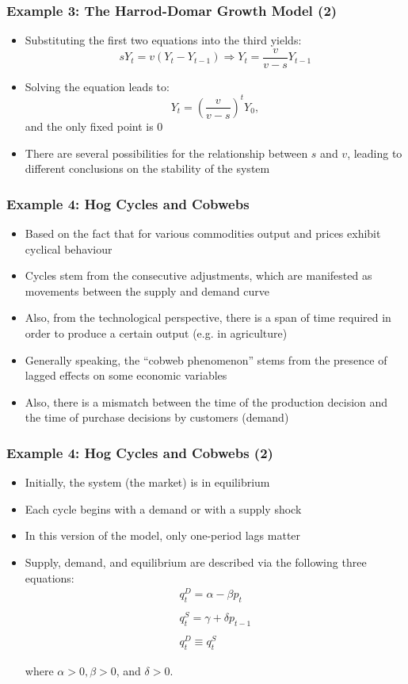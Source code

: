 \documentclass[10pt,usenames,dvipsnames]{beamer}
\theoremstyle{definition}
\begin{document}
\begin{frame}[fragile]
\frametitle{Example 3: The Harrod-Domar Growth Model (2)}
\begin{itemize}
	\item Substituting the first two equations into the third yields:
	\[
		sY_{t} = v(Y_{t} - Y_{t-1}) \Rightarrow Y_{t} = \frac{v}{v-s}Y_{t-1}
	\]
	\item Solving the equation leads to:
	\[
		Y_{t} = \left(\frac{v}{v-s}\right)^{t}Y_{0},
	\]
	and the only fixed point is 0
	\item There are several possibilities for the relationship between $s$ and $v$, leading to different conclusions on the stability of the system
\end{itemize}
\end{frame}

\begin{frame}[fragile]
\frametitle{Example 4: Hog Cycles and Cobwebs}
\begin{itemize}
	\item Based on the fact that for various commodities output and prices exhibit cyclical behaviour  
	\item Cycles stem from the consecutive adjustments, which are manifested as movements between the supply and demand curve
	\item Also, from the technological perspective, there is a span of time required in order to produce a certain output (e.g. in agriculture)
	\item Generally speaking, the ``cobweb phenomenon'' stems from the presence of lagged effects on some economic variables
	\item Also, there is a mismatch between the time of the production decision and the time of purchase decisions by customers (demand)
\end{itemize}
\end{frame}

\begin{frame}[fragile]
\frametitle{Example 4: Hog Cycles and Cobwebs (2)}
\begin{itemize}
	\item Initially, the system (the market) is in equilibrium
	\item Each cycle begins with a demand or with a supply shock
	\item In this version of the model, only one-period lags matter
	\item Supply, demand, and equilibrium are described via the following three equations:
	\[
	\begin{array}{lcl}
		q_{t}^{D} = \alpha - \beta p_{t}\\
		\quad\\
		q_{t}^{S} = \gamma + \delta p_{t-1}\\
		\quad\\
		q_{t}^{D} \equiv q_{t}^{S}
	\end{array}
	\]
	
	where $\alpha > 0, \beta > 0$, and $\delta > 0$.
\end{itemize}
\end{frame}
\end{document}
